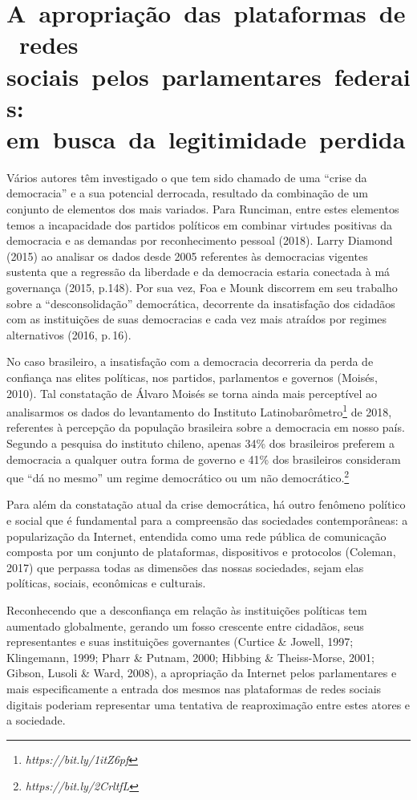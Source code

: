 \section{A~apropriação~das~plataformas~de~redes sociais~pelos~parlamentares~federais: em~busca~da~legitimidade~perdida}

Vários autores têm investigado o que tem sido chamado de uma ``crise da
democracia'' e a sua potencial derrocada, resultado da combinação de um
conjunto de elementos dos mais variados. Para Runciman, entre estes
elementos temos a incapacidade dos partidos políticos em combinar
virtudes positivas da democracia e as demandas por reconhecimento
pessoal (2018). Larry Diamond (2015) ao analisar os dados desde 2005
referentes às democracias vigentes sustenta que a regressão da liberdade
e da democracia estaria conectada à má governança (2015, p.148). Por sua
vez, Foa e Mounk discorrem em seu trabalho sobre a ``desconsolidação''
democrática, decorrente da insatisfação dos cidadãos com as instituições
de suas democracias e cada vez mais atraídos por regimes alternativos
(2016, p.\,16).

No caso brasileiro, a insatisfação com a democracia decorreria da perda
de confiança nas elites políticas, nos partidos, parlamentos e governos
(Moisés, 2010). Tal constatação de Álvaro Moisés se torna ainda mais
perceptível ao analisarmos os dados do levantamento do Instituto
Latinobarômetro\footnote{\emph{https://bit.ly/1itZ6pf}}
de 2018, referentes à percepção da população brasileira sobre a
democracia em nosso país. Segundo a pesquisa do instituto chileno,
apenas 34\% dos brasileiros preferem a democracia a qualquer outra forma
de governo e 41\% dos brasileiros consideram que ``dá no mesmo'' um
regime democrático ou um não democrático.\footnote{\emph{https://bit.ly/2CrltfL}}

Para além da constatação atual da crise democrática, há outro fenômeno
político e social que é fundamental para a compreensão das sociedades
contemporâneas: a popularização da Internet, entendida como uma rede
pública de comunicação composta por um conjunto de plataformas,
dispositivos e protocolos (Coleman, 2017) que perpassa todas as
dimensões das nossas sociedades, sejam elas políticas, sociais,
econômicas e culturais.

Reconhecendo que a desconfiança em relação às instituições políticas tem
aumentado globalmente, gerando um fosso crescente entre cidadãos, seus
representantes e suas instituições governantes (Curtice \& Jowell, 1997;
Klingemann, 1999; Pharr \& Putnam, 2000; Hibbing \& Theiss-Morse, 2001;
Gibson, Lusoli \& Ward, 2008), a apropriação da Internet pelos
parlamentares e mais especificamente a entrada dos mesmos nas
plataformas de redes sociais digitais poderiam representar uma tentativa
de reaproximação entre estes atores e a sociedade.

